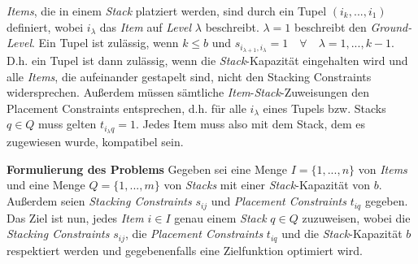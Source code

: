 \textit{Items}, die in einem \textit{Stack} platziert werden, sind durch ein Tupel $(i_k, ..., i_1)$ definiert, wobei
$i_\lambda$ das \textit{Item} auf \textit{Level} $\lambda$ beschreibt. $\lambda = 1$ beschreibt den \textit{Ground-Level}.
Ein Tupel ist zulässig, wenn $k \leq b$ und $s_{i_{\lambda + 1}, i_\lambda} = 1 \quad \forall \quad \lambda = 1, ..., k - 1$.
D.h. ein Tupel ist dann zulässig, wenn die \textit{Stack}-Kapazität eingehalten wird und alle \textit{Items}, die aufeinander gestapelt sind,
nicht den Stacking Constraints widersprechen. Außerdem müssen sämtliche \textit{Item}-\textit{Stack}-Zuweisungen den Placement Constraints entsprechen, d.h. für alle $i_\lambda$ eines Tupels bzw. Stacks $q \in Q$ muss gelten $t_{i_\lambda q} = 1$. Jedes Item muss also mit dem Stack, dem es zugewiesen wurde, kompatibel sein.

\pagebreak

\textbf{Formulierung des Problems}\newline
Gegeben sei eine Menge $I = \{1, ..., n\}$ von \textit{Items} und eine Menge $Q = \{1, ..., m\}$ von \textit{Stacks} mit einer \textit{Stack}-Kapazität von $b$. Außerdem seien \textit{Stacking Constraints} $s_{ij}$ und \textit{Placement Constraints} $t_{iq}$ gegeben.
Das Ziel ist nun, jedes \textit{Item} $i \in I$ genau einem \textit{Stack} $q \in Q$ zuzuweisen, wobei die \textit{Stacking Constraints} $s_{ij}$,
die \textit{Placement Constraints} $t_{iq}$ und die \textit{Stack}-Kapazität $b$ respektiert werden und gegebenenfalls eine Zielfunktion optimiert wird.

